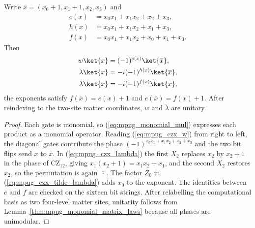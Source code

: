 \begin{lemma}
    \label{thm:mpug_czx_phase_tables}
    \leanok
    Write $\overline x=(x_0+1,x_1+1,x_2,x_3)$ and
    \begin{align}
        e(x) & =x_0x_1+x_1x_2+x_2+x_3,     \\
        h(x) & =x_0x_1+x_1x_2+x_1+x_3,     \\
        f(x) & =x_0x_1+x_1x_2+x_0+x_1+x_3.
    \end{align}
    Then
    \begin{align}
        w\ket{x}             & =(-1)^{e(x)}\ket{\overline x},
        \label{eq:mpug_czx_w_action}                            \\
        \lambda\ket{x}       & =-i(-1)^{h(x)}\ket{\overline x},
        \label{eq:mpug_czx_lambda_action}                       \\
        \tilde\lambda\ket{x} & =-i(-1)^{f(x)}\ket{\overline x},
        \label{eq:mpug_czx_tilde_lambda_action}
    \end{align}
    the exponents satisfy $f(\overline x)=e(x)+1$ and
    $e(\overline x)=f(x)+1$. After reindexing to the two-site matter coordinates,
    $w$ and $\tilde\lambda$ are unitary.
\end{lemma}

\begin{proof}\leanok
    Each gate is monomial, so (\ref{eq:mpug_monomial_mul}) expresses each
    product as a monomial operator. Reading (\ref{eq:mpug_czx_w}) from right
    to left, the diagonal gates contribute the phase
    $(-1)^{x_0x_1+x_1x_2+x_2+x_3}$ and the two bit flips send $x$ to
    $\overline x$. In (\ref{eq:mpug_czx_lambda}) the first $X_2$ replaces
    $x_2$ by $x_2+1$ in the phase of $\mathrm{CZ}_{12}$, giving
    $x_1(x_2+1)=x_1x_2+x_1$, and the second $X_2$ restores $x_2$, so the
    permutation is again $\overline{\,\cdot\,}$. The factor $Z_0$ in
    (\ref{eq:mpug_czx_tilde_lambda}) adds $x_0$ to the exponent. The
    identities between $e$ and $f$ are checked on the sixteen bit strings.
    After relabelling the computational basis as two four-level matter sites,
    unitarity follows from Lemma~\ref{thm:mpug_monomial_matrix_laws} because
    all phases are unimodular.
\end{proof}

